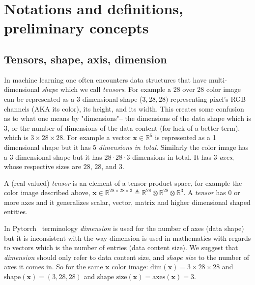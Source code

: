 \documentclass[11pt, a4paper]{report}
\theoremstyle{plain}
\theoremstyle{definition}
\theoremstyle{remark}
\newcommand{\R}{\mathbb{R}}
\newcommand{\x}{\mathbf{x}}
\begin{document}
\chapter{Notations and definitions, preliminary concepts}


\section{Tensors, shape, axis, dimension}
In machine learning one often encounters data structures that have
multi-dimensional \emph{shape} which we call \emph{tensors}. For example a 28
over 28 color image can be represented as a 3-dimensional shape ($3,28, 28)$
representing pixel's RGB channels (AKA its color), its height, and its
width. This creates some
confusion as to what one means by "dimensions"-- the dimensions of the data shape
which is $3$,
or the number of dimensions of the data content (for lack of a better term),
which is  $3 \times 28 \times 28$. For example a vector $\x \in \R^5$
is represented as a 1 dimensional shape but it has $5$ \emph{dimensions in
total}. Similarly the color image has a $3$ dimensional shape but it has $28
\cdot 28 \cdot 3$ dimensions in total. It has 3 \emph{axes}, whose respective
sizes are $28$, $28$, and $3$. 

A (real valued) \emph{tensor} is an element of a tensor product space, for
example the color image described above, $\x \in  \R^{28 \times 28 \times 3}
\triangleq \R^{28} \otimes \R^{28} \otimes \R^3$. A \emph{tensor} has $0$ or
more axes and it generalizes scalar, vector, matrix and higher dimensional
shaped entities.

In Pytorch~\cite{pytorch2018pytorch} terminology \emph{dimension} is used for the
number of axes (data shape) but it is inconsistent with the way dimension is used in
mathematics with regards to vectors which is the number of entries (data
content size). 
We suggest that \emph{dimension} should only refer to data content size,  
and \emph{shape size} to the number of axes it comes in. So for the same $\x$ color
image: $\text{dim}(\x) = 3 \times 28 \times 28$ and $\text{shape}(\x) =
(3,28,28)$ and $\text{shape size}(\x) = \text{axes}(\x) = 3$.
\end{document}
